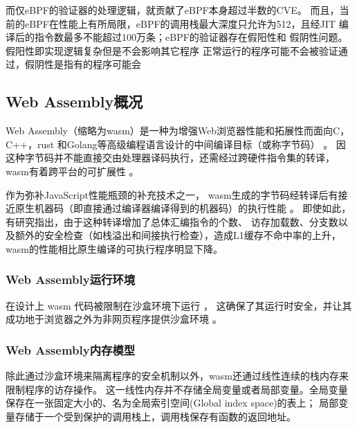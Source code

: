     而仅eBPF的验证器的处理逻辑，就贡献了eBPF本身超过半数的CVE\cite{hive}。
    而且，当前的eBPF在性能上有所局限，eBPF的调用栈最大深度只允许为512，且经JIT
    编译后的指令数最多不能超过100万条；eBPF的验证器存在假阳性\cite{hive}和
    假阴性问题\cite{RJXB202312023}。假阳性即实现逻辑复杂但是不会影响其它程序
    正常运行的程序可能不会被验证通过，假阴性是指有的程序可能会

\subsection{Web Assembly概况}
    Web Assembly（缩略为wasm）是一种为增强Web浏览器性能和拓展性而面向C，C++，rust
    和Golang等高级编程语言设计的中间编译目标（或称字节码）
    \cite{wasmCommunityGroup, lehmannWasabiFrameworkDynamically2019, 
        lehmannEverythingOldNew, bhansaliFirstLookCode2022, waseemIssuesTheirCauses2024}。
    因这种字节码并不能直接交由处理器译码执行，还需经过跨硬件指令集的转译，wasm有着跨平台的可扩展性
    \cite{lehmannEverythingOldNew, waseemIssuesTheirCauses2024, 
        lehmannWasabiFrameworkDynamically2019, JayProvablySafe, 
        WebAssemblySummaryOnSecurity, rayOverviewWebAssemblyIoT2023}。

    作为弥补JavaScript性能瓶颈的补充技术之一\cite{rayOverviewWebAssemblyIoT2023}，
    wasm生成的字节码经转译后有接近原生机器码（即直接通过编译器编译得到的机器码）的执行性能
    \cite{haasBringingWebSpeed2017,johnsonWaVeVerifiablySecure2023}。
    即使如此，有研究\cite{JangdaNotsoFast}指出，由于这种转译增加了总体汇编指令的个数、
    访存加载数、分支数以及额外的安全检查（如栈溢出和间接执行检查），造成L1缓存不命中率的上升，
    wasm的性能相比原生编译的可执行程序明显下降。

\subsubsection{Web Assembly运行环境}
    在设计上 wasm 代码被限制在沙盒环境下运行
    \cite{johnsonWaVeVerifiablySecure2023,WasmbpfStreamliningEBPF2024}，
    这确保了其运行时安全，并让其成功地于浏览器之外为非网页程序提供沙盒环境
    \cite{narayanSwivelHardeningWebAssembly, WebAssemblySummaryOnSecurity, 9156135}。

\subsubsection{Web Assembly内存模型}
    除此通过沙盒环境来隔离程序的安全机制以外，wasm还通过线性连续的栈内存来限制程序的访存操作。
    这一线性内存并不存储全局变量或者局部变量。全局变量保存在一张固定大小的、名为全局索引空间(Global index space)的表上；
    局部变量存储于一个受到保护的调用栈上，调用栈保存有函数的返回地址。

